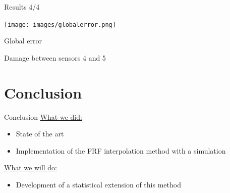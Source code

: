 \documentclass{beamer}
\begin{document}
\begin{frame}{Results 4/4}
\begin{center}
\texttt{[image: images/globalerror.png]}

Global error

\vspace{5mm}

Damage between sensors 4 and 5
\end{center}

\end{frame}



\section{Conclusion}

\begin{frame}{Conclusion}
\underline{What we did:}
\begin{itemize}
\item State of the art
\item Implementation of the FRF interpolation method with a simulation
\end{itemize}

\underline{What we will do:}
\begin{itemize}
\item Development of a statistical extension of this method
\end{itemize}



\end{frame}


  
\end{document}
